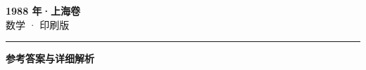 \documentclass[zihao=5, a4paper]{ctexart}
\begin{document}
\begin{center}
  {\Large\bfseries 1988 年·上海卷}\\[4pt]
  {\large 数学 · 印刷版}
\end{center}
\medskip
{}

\par\bigskip\hrule\bigskip
{}
\begin{center}{\large\bfseries 参考答案与详细解析}\end{center}
\smallskip

\end{document}
